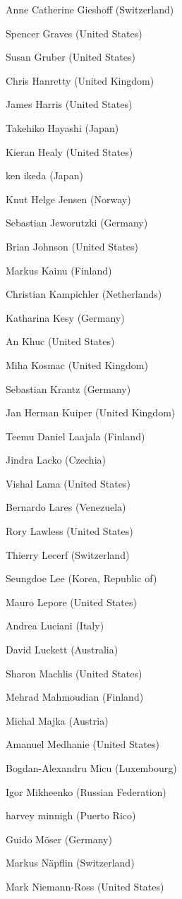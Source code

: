 Anne Catherine Gieshoff (Switzerland)

Spencer Graves (United States)

Susan Gruber (United States)

Chris Hanretty (United Kingdom)

James Harris (United States)

Takehiko Hayashi (Japan)

Kieran Healy (United States)

ken ikeda (Japan)

Knut Helge Jensen (Norway)

Sebastian Jeworutzki (Germany)

Brian Johnson (United States)

Markus Kainu (Finland)

Christian Kampichler (Netherlands)

Katharina Kesy (Germany)

An Khuc (United States)

Miha Kosmac (United Kingdom)

Sebastian Krantz (Germany)

Jan Herman Kuiper (United Kingdom)

Teemu Daniel Laajala (Finland)

Jindra Lacko (Czechia)

Vishal Lama (United States)

Bernardo Lares (Venezuela)

Rory Lawless (United States)

Thierry Lecerf (Switzerland)

Seungdoe Lee (Korea, Republic of)

Mauro Lepore (United States)

Andrea Luciani (Italy)

David Luckett (Australia)

Sharon Machlis (United States)

Mehrad Mahmoudian (Finland)

Michal Majka (Austria)

Amanuel Medhanie (United States)

Bogdan-Alexandru Micu (Luxembourg)

Igor Mikheenko (Russian Federation)

harvey minnigh (Puerto Rico)

Guido Möser (Germany)

Markus Näpflin (Switzerland)

Mark Niemann-Ross (United States)

